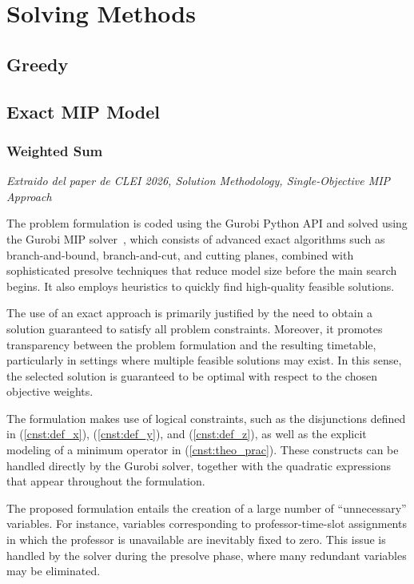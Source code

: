 \section{Solving Methods}

\subsection{Greedy}

\subsection{Exact MIP Model}

    \subsubsection{Weighted Sum}

    \textit{Extraido del paper de CLEI 2026, Solution Methodology, Single-Objective MIP Approach}

    
    The problem formulation is coded using the Gurobi Python API and solved using the Gurobi MIP solver~\cite{gurobi}, which consists of advanced exact algorithms such as branch-and-bound, branch-and-cut, and cutting planes, combined with sophisticated presolve techniques that reduce model size before the main search begins. It also employs heuristics to quickly find high-quality feasible solutions.

    The use of an exact approach is primarily justified by the need to obtain a solution guaranteed to satisfy all problem constraints. Moreover, it promotes transparency between the problem formulation and the resulting timetable, particularly in settings where multiple feasible solutions may exist. In this sense, the selected solution is guaranteed to be optimal with respect to the chosen objective weights.

    The formulation makes use of logical constraints, such as the disjunctions defined in (\ref{cnst:def_x}), (\ref{cnst:def_y}), and (\ref{cnst:def_z}), as well as the explicit modeling of a minimum operator in (\ref{cnst:theo_prac}). These constructs can be handled directly by the Gurobi solver, together with the quadratic expressions that appear throughout the formulation.

    The proposed formulation entails the creation of a large number of ``unnecessary'' variables. For instance, variables corresponding to professor-time-slot assignments in which the professor is unavailable are inevitably fixed to zero. This issue is handled by the solver during the presolve phase, where many redundant variables may be eliminated.
  


